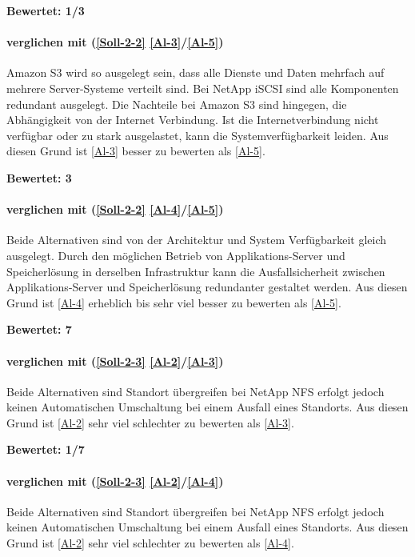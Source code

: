 \textbf{Bewertet: 1/3}

\paragraph*{  verglichen mit  (\ref{Soll-2-2} \ref{Al-3}/\ref{Al-5})}
Amazon S3 wird so ausgelegt sein, dass alle Dienste und Daten mehrfach auf mehrere Server-Systeme verteilt sind. Bei NetApp iSCSI sind alle Komponenten redundant ausgelegt. Die Nachteile bei Amazon S3 sind hingegen, die Abhängigkeit von der Internet Verbindung. Ist die Internetverbindung nicht verfügbar oder zu stark ausgelastet, kann die Systemverfügbarkeit leiden.
Aus diesen Grund ist  \ref{Al-3} besser zu bewerten als  \ref{Al-5}.

\textbf{Bewertet: 3}


\paragraph*{  verglichen mit  (\ref{Soll-2-2} \ref{Al-4}/\ref{Al-5})}
Beide Alternativen sind von der Architektur und System Verfügbarkeit gleich ausgelegt. Durch den möglichen Betrieb von Applikations-Server und Speicherlösung in derselben Infrastruktur kann die Ausfallsicherheit zwischen Applikations-Server und Speicherlösung redundanter gestaltet werden. Aus diesen Grund ist  \ref{Al-4} erheblich bis sehr viel besser zu bewerten als  \ref{Al-5}.

\textbf{Bewertet: 7}


\paragraph*{  verglichen mit  (\ref{Soll-2-3} \ref{Al-2}/\ref{Al-3})}
Beide Alternativen sind Standort übergreifen bei NetApp NFS erfolgt jedoch keinen Automatischen Umschaltung bei einem Ausfall eines Standorts. Aus diesen Grund ist  \ref{Al-2} sehr viel schlechter zu bewerten als  \ref{Al-3}.

\textbf{Bewertet: 1/7}

\paragraph*{  verglichen mit  (\ref{Soll-2-3} \ref{Al-2}/\ref{Al-4})}
Beide Alternativen sind Standort übergreifen bei NetApp NFS erfolgt jedoch keinen Automatischen Umschaltung bei einem Ausfall eines Standorts. Aus diesen Grund ist  \ref{Al-2} sehr viel schlechter zu bewerten als  \ref{Al-4}.

